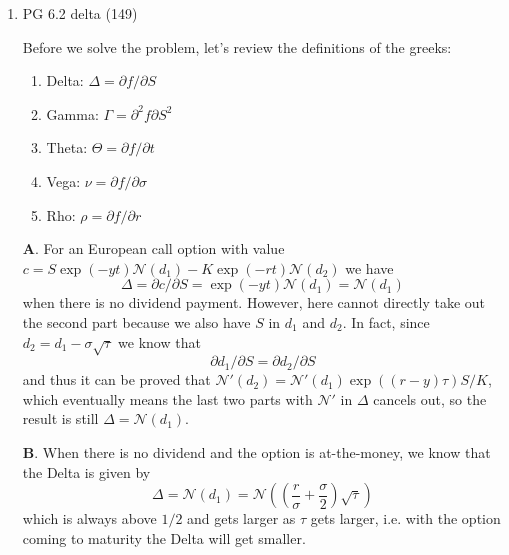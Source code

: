 \documentclass[11pt]{article}
\newcommand{\E}{\text{E}}
\newcommand{\bs}{\boldsymbol}
\renewcommand{\d}{\text{d}}
\newenvironment{note}{\begin{enumerate}[leftmargin=1em,topsep=0pt,noitemsep]}{\end{enumerate}}
\newenvironment{nnote}{\begin{enumerate}[leftmargin=.95em,topsep=0pt,noitemsep,label=$\bs{\cdot}$]}{\end{enumerate}}
\newcommand{\solution}{\boxed{\textbf{SOLUTION}}\hspace{.5em}}
\begin{document}
\begin{spacing}{1.1}
\begin{note}
      \textbf{E}. Assume $S\sim\text{GBM}(r, \sigma^2)$, then the derivative has payoff $f(S) = 1/S$ and thus by Ito's lemma we have
      $$
      \d f = \left(\frac{\partial f}{\partial t} + \frac{\partial f}{\partial S}r S + \frac{\partial^2 f}{\partial S^2}\frac{\sigma^2 S^2}{2}\right)\d t + \frac{\partial f}{\partial S}\sigma S\d w = (\sigma^2 - r)f \d t - \sigma f \d w
      $$
      and thus
      $$
      \ln f = \left(\frac{\sigma^2}{2} - r\right)\d t - \sigma\d w.
      $$
      Therefore, we have 
      $$
      \ln f(T) = \ln f(t) + \mathcal{N}((\sigma^2/2 - r)\tau, \sigma^2\tau)
      $$
      and thus we know $\E[f(T)] = \E[\exp(\ln f(T))] = \exp(\sigma^2 \tau  - r \tau) / S_T$. Discount this value using risk-free interest rate $r$ and we have $V = \exp(\sigma^2\tau -2r\tau) / S$.
\item PG 6.2 delta (149)

      \solution Before we solve the problem, let's review the definitions of the greeks:
      \begin{nnote}
      \item Delta: $\Delta = \partial f / \partial S$
      \item Gamma: $\Gamma = \partial^2 f \partial S^2$
      \item Theta: $\Theta = \partial f / \partial t$
      \item Vega: $\nu = \partial f / \partial \sigma$
      \item Rho: $\rho = \partial f / \partial r$
      \end{nnote}
      \textbf{A}. For an European call option with value $c = S\exp(-yt)\mathcal{N}(d_1) - K\exp(-rt)\mathcal{N}(d_2)$ we have
      $$
      \Delta = \partial c / \partial S = \exp(-yt)\mathcal{N}(d_1) = \mathcal{N}(d_1)
      $$
      when there is no dividend payment. However, here cannot directly take out the second part because we also have $S$ in $d_1$ and $d_2$. In fact, since $d_2 = d_1 -\sigma\sqrt{\tau}$ we know that
      $$
      \partial d_1 / \partial S = \partial d_2 / \partial S
      $$
      and thus it can be proved that $\mathcal{N}'(d_2) = \mathcal{N}'(d_1)\exp((r-y)\tau)S / K$, which eventually means the last two parts with $\mathcal{N}'$ in $\Delta$ cancels out, so the result is still $\Delta = \mathcal{N}(d_1)$.

      \textbf{B}. When there is no dividend and the option is at-the-money, we know that the Delta is given by
      $$
      \Delta = \mathcal{N}(d_1) = \mathcal{N}\left(\left(\frac{r}{\sigma} + \frac{\sigma}{2}\right)\sqrt{\tau}\right)
      $$
      which is always above $1/2$ and gets larger as $\tau$ gets larger, i.e. with the option coming to maturity the Delta will get smaller.


\end{note}
\end{spacing}
\end{document}
